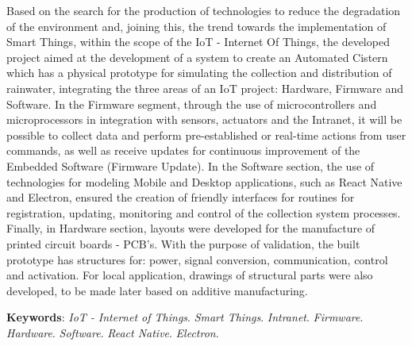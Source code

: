 
\begin{resumo}[ABSTRACT]
\begin{SingleSpacing}


Based on the search for the production of technologies to reduce the degradation of the environment and, joining this, the trend towards the implementation of Smart Things, within the scope of the IoT - Internet Of Things, the developed project aimed at the development of a system to create an Automated Cistern which has a physical prototype for simulating the collection and distribution of rainwater, integrating the three areas of an IoT project: Hardware, Firmware and Software. In the Firmware segment, through the use of microcontrollers and microprocessors in integration with sensors, actuators and the Intranet, it will be possible to collect data and perform pre-established or real-time actions from user commands, as well as receive updates for continuous improvement of the Embedded Software (Firmware Update). In the Software section, the use of technologies for modeling Mobile and Desktop applications, such as React Native and Electron, ensured the creation of friendly interfaces for routines for registration, updating, monitoring and control of the collection system processes. Finally, in Hardware section, layouts were developed for the manufacture of printed circuit boards - PCB's. With the purpose of validation, the built prototype has structures for: power, signal conversion, communication, control and activation. For local application, drawings of structural parts were also developed, to be made later based on additive manufacturing.


\vspace{\onelineskip}

\textbf{Keywords}: \textit{IoT - Internet of Things}. \textit{Smart Things}. \textit{Intranet}.   \textit{Firmware}. \textit{Hardware}. \textit{Software}. \textit{React Native}. \textit{Electron}.

\end{SingleSpacing}
\end{resumo}

